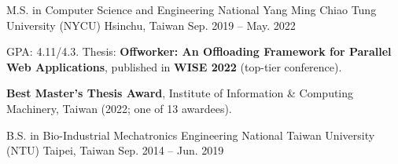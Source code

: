 
\begin{cventries}

  
\cventry
  {M.S. in Computer Science and Engineering} %
  {National Yang Ming Chiao Tung University (NYCU)} %
  {Hsinchu, Taiwan} %
  {Sep. 2019 -- May. 2022} %
  {
    \begin{cvitems} %
  \item {GPA: 4.11/4.3. Thesis: \textbf{Offworker: An Offloading Framework for Parallel Web Applications}, published in \textbf{WISE 2022} (top-tier conference).}
  \item {\textbf{Best Master's Thesis Award}, Institute of Information \& Computing Machinery, Taiwan (2022; one of 13 awardees).}
    \end{cvitems}
  }

  \vspace{2mm}


\cventry
    {B.S. in Bio-Industrial Mechatronics Engineering} %
    {National Taiwan University (NTU)} %
    {Taipei, Taiwan} %
  {Sep. 2014 -- Jun. 2019} %
    {}
  \vspace{-8mm}

\end{cventries}
